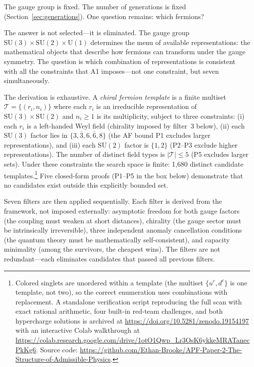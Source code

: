 \documentclass[11pt]{article}
\newcommand{\SU}{\mathrm{SU}}
\newcommand{\U}{\mathrm{U}}
\begin{document}
The gauge group is fixed.  The number of generations is fixed (Section~\ref{sec:generations}).  One question remains: which fermions?

The answer is not selected---it is eliminated.  The gauge group $\SU(3) \times \SU(2) \times \U(1)$ determines the menu of available representations: the mathematical objects that describe how fermions can transform under the gauge symmetry.  The question is which combination of representations is consistent with all the constraints that A1 imposes---not one constraint, but seven simultaneously.

The derivation is exhaustive.  A \emph{chiral fermion template} is a finite multiset $\mathcal{T} = \{(r_i, n_i)\}$ where each $r_i$ is an irreducible representation of $\SU(3) \times \SU(2)$ and $n_i \ge 1$ is its multiplicity, subject to three constraints: (i) each $r_i$ is a left-handed Weyl field (chirality imposed by filter~3 below), (ii) each $\SU(3)$ factor lies in $\{3, \bar{3}, 6, \bar{6}, 8\}$ (the AF bound P1 excludes larger representations), and (iii) each $\SU(2)$ factor is $\{1, 2\}$ (P2--P3 exclude higher representations).  The number of distinct field types is $|\mathcal{T}| \le 5$ (P5 excludes larger sets).  Under these constraints the search space is finite: 1{,}680 distinct candidate templates.\footnote{Colored singlets are unordered within a template (the multiset $\{u^c, d^c\}$ is one template, not two), so the correct enumeration uses combinations with replacement.  A standalone verification script reproducing the full scan with exact rational arithmetic, four built-in red-team challenges, and both hypercharge solutions is archived at \url{https://doi.org/10.5281/zenodo.19154197} with an interactive Colab walkthrough at \url{https://colab.research.google.com/drive/1otO1Qwp_Lr3OsK6ykkeMRATanecPkKg6}.  Source code: \url{https://github.com/Ethan-Brooke/APF-Paper-2-The-Structure-of-Admissible-Physics}.}  Five closed-form proofs (P1--P5 in the box below) demonstrate that no candidates exist outside this explicitly bounded set.

Seven filters are then applied sequentially.  Each filter is derived from the framework, not imposed externally: asymptotic freedom for both gauge factors (the coupling must weaken at short distances), chirality (the gauge sector must be intrinsically irreversible), three independent anomaly cancellation conditions (the quantum theory must be mathematically self-consistent), and capacity minimality (among the survivors, the cheapest wins).  The filters are not redundant---each eliminates candidates that passed all previous filters.
\end{document}
